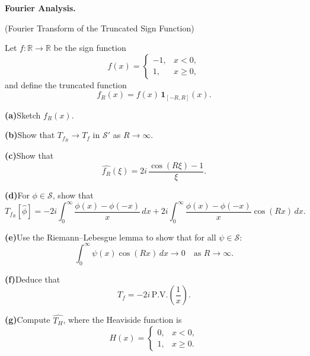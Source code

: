 \begin{problem}[CP-II-0116]
\label{prob:cp-ii-0116}
\textbf{Fourier Analysis.}

\hspace*{1.5em}(Fourier Transform of the Truncated Sign Function)

Let $f:\mathbb{R}\to\mathbb{R}$ be the sign function
\[
f(x) =
\begin{cases}
	-1, & x<0,\\[0.2em]
	1, & x\ge 0,
\end{cases}
\]
and define the truncated function
\[
f_R(x) = f(x)\,\mathbf{1}_{[-R,R]}(x).
\]

	\par\smallskip\noindent\textbf{(a)}\quad Sketch $f_R(x)$.

	\par\smallskip\noindent\textbf{(b)}\quad Show that $T_{f_R} \to T_f$ in $\mathcal{S}'$ as $R\to\infty$.

	\par\smallskip\noindent\textbf{(c)}\quad Show that
	\[
	\widehat{f_R}(\xi) =
	2i\,\frac{\cos(R\xi)-1}{\xi}.
	\]

	\par\smallskip\noindent\textbf{(d)}\quad For $\phi\in\mathcal{S}$, show that
	\[
	T_{f_R}[\widehat{\phi}]
	= -2i\int_0^\infty \frac{\phi(x)-\phi(-x)}{x}\,dx
	+ 2i\int_0^\infty \frac{\phi(x)-\phi(-x)}{x}\cos(Rx)\,dx.
	\]

	\par\smallskip\noindent\textbf{(e)}\quad Use the Riemann--Lebesgue lemma to show that for all $\psi\in\mathcal{S}$:
	\[
	\int_0^\infty \psi(x)\cos(Rx)\,dx \to 0
	\quad \text{as } R\to\infty.
	\]

	\par\smallskip\noindent\textbf{(f)}\quad Deduce that
	\[
	\widehat{T_f} = -2i\,\mathrm{P.V.}\!\left(\frac{1}{x}\right).
	\]

	\par\smallskip\noindent\textbf{(g)}\quad Compute $\widehat{T_H}$, where the Heaviside function is
	\[
	H(x)=
	\begin{cases}
		0, & x<0,\\[0.2em]
		1, & x\ge 0.
	\end{cases}
	\]
\end{problem}

